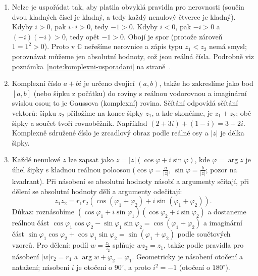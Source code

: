 \begin{enumerate}[label=\textbf{\arabic*.}, leftmargin=*, itemsep=0.8em]
  \item {}
  Nelze je uspořádat tak, aby platila obvyklá pravidla pro nerovnosti (součin dvou kladných čísel je kladný, a tedy každý nenulový čtverec je kladný). Kdyby $i > 0$, pak $i\cdot i > 0$, tedy $-1 > 0$. Kdyby $i < 0$, pak $-i > 0$ a $(-i)(-i) > 0$, tedy opět $-1 > 0$. Obojí je spor (protože zároveň $1 = 1^2 > 0$). Proto v $\mathbb{C}$ neřešíme nerovnice a zápis typu $z_1 < z_2$ nemá smysl; porovnávat můžeme jen absolutní hodnoty, což jsou reálná čísla. Podrobně viz poznámka~\ref{note:komplexni-usporadani} na straně~\pageref{note:komplexni-usporadani}.

  \item {}
  Komplexní číslo $a + bi$ je určeno dvojicí $(a, b)$, takže ho zakreslíme jako bod $[a, b]$ (nebo šipku z počátku) do roviny s reálnou vodorovnou a imaginární svislou osou; to je Gaussova (komplexní) rovina. Sčítání odpovídá sčítání vektorů: šipku $z_2$ přiložíme na konec šipky $z_1$, a kde skončíme, je $z_1 + z_2$; obě šipky a součet tvoří rovnoběžník. Například $(2 + 3i) + (1 - i) = 3 + 2i$. Komplexně sdružené číslo je zrcadlový obraz podle reálné osy a $|z|$ je délka šipky. 

  \item {}
  Každé nenulové $z$ lze zapsat jako $z = |z|(\cos\varphi + i\sin\varphi)$, kde $\varphi = \arg z$ je úhel šipky s kladnou reálnou poloosou ($\cos\varphi = \frac{a}{|z|}$, $\sin\varphi = \frac{b}{|z|}$; pozor na kvadrant). Při násobení se absolutní hodnoty násobí a argumenty sčítají, při dělení se absolutní hodnoty dělí a argumenty odečítají:
  \begin{equation*}
    z_1z_2 = r_1r_2\left(\cos(\varphi_1 + \varphi_2) + i\sin(\varphi_1 + \varphi_2)\right).
  \end{equation*}
  Důkaz: roznásobíme $(\cos\varphi_1 + i\sin\varphi_1)(\cos\varphi_2 + i\sin\varphi_2)$ a dostaneme reálnou část $\cos\varphi_1\cos\varphi_2 - \sin\varphi_1\sin\varphi_2 = \cos(\varphi_1 + \varphi_2)$ a imaginární část $\sin\varphi_1\cos\varphi_2 + \cos\varphi_1\sin\varphi_2 = \sin(\varphi_1 + \varphi_2)$ podle součtových vzorců. Pro dělení: podíl $w = \frac{z_1}{z_2}$ splňuje $wz_2 = z_1$, takže podle pravidla pro násobení $|w|r_2 = r_1$ a $\arg w + \varphi_2 = \varphi_1$. Geometricky je násobení otočení a natažení; násobení $i$ je otočení o $90^\circ$, a proto $i^2 = -1$ (otočení o $180^\circ$). 


\end{enumerate}
